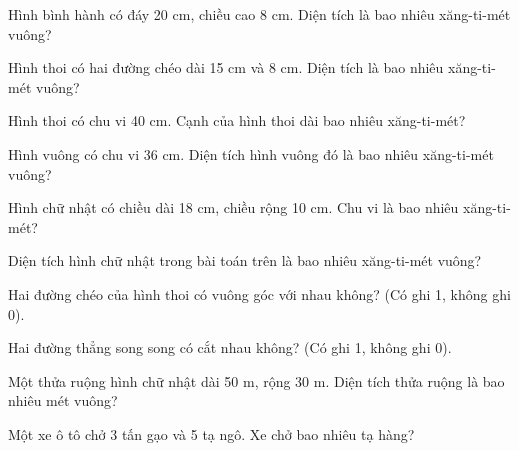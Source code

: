 \begin{ex}
Hình bình hành có đáy 20 cm, chiều cao 8 cm. Diện tích là bao nhiêu xăng-ti-mét vuông?
\end{ex}

\begin{ex}
Hình thoi có hai đường chéo dài 15 cm và 8 cm. Diện tích là bao nhiêu xăng-ti-mét vuông?
\end{ex}

\begin{ex}
Hình thoi có chu vi 40 cm. Cạnh của hình thoi dài bao nhiêu xăng-ti-mét?
\end{ex}

\begin{ex}
Hình vuông có chu vi 36 cm. Diện tích hình vuông đó là bao nhiêu xăng-ti-mét vuông?
\end{ex}

\begin{ex}
Hình chữ nhật có chiều dài 18 cm, chiều rộng 10 cm. Chu vi là bao nhiêu xăng-ti-mét?
\end{ex}

\begin{ex}
Diện tích hình chữ nhật trong bài toán trên là bao nhiêu xăng-ti-mét vuông?
\end{ex}

\begin{ex}
Hai đường chéo của hình thoi có vuông góc với nhau không? (Có ghi 1, không ghi 0).
\end{ex}

\begin{ex}
Hai đường thẳng song song có cắt nhau không? (Có ghi 1, không ghi 0).
\end{ex}

\begin{ex}
Một thửa ruộng hình chữ nhật dài 50 m, rộng 30 m. Diện tích thửa ruộng là bao nhiêu mét vuông?
\end{ex}

\begin{ex}
Một xe ô tô chở 3 tấn gạo và 5 tạ ngô. Xe chở bao nhiêu tạ hàng?
\end{ex}

